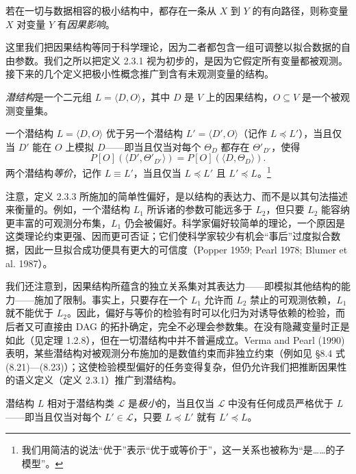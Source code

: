 \begin{definition}[推断因果性（初步）]
若在一切与数据相容的极小结构中，都存在一条从 $X$ 到 $Y$ 的有向路径，则称变量 $X$ 对变量 $Y$ 有\emph{因果影响}。
\end{definition}

这里我们把因果结构等同于科学理论，因为二者都包含一组可调整以拟合数据的自由参数。我们之所以把定义 2.3.1 视为初步的，是因为它假定所有变量都被观测。接下来的几个定义把极小性概念推广到含有未观测变量的结构。

\begin{definition}[潜结构]
\emph{潜结构}是一个二元组 $L=\langle D,O\rangle$，其中 $D$ 是 $V$ 上的因果结构，$O\subseteq V$ 是一个被观测变量集。
\end{definition}

\begin{definition}[结构偏好]
一个潜结构 $L=\langle D,O\rangle$ 优于另一个潜结构 $L'=\langle D',O\rangle$（记作 $L\preceq L'$），当且仅当 $D'$ 能在 $O$ 上模拟 $D$——即当且仅当对每个 $\Theta_D$ 都存在 $\Theta'_{D'}$，使得
\[
P[O](\langle D',\Theta'_{D'}\rangle)=P[O](\langle D,\Theta_D\rangle).
\]
两个潜结构\emph{等价}，记作 $L\equiv L'$，当且仅当 $L\preceq L'$ 且 $L'\preceq L$。\footnote{我们用简洁的说法“优于”表示“优于或等价于”，这一关系也被称为“是……的子模型”。}
\end{definition}

注意，定义 2.3.3 所施加的简单性偏好，是以结构的表达力、而不是以其句法描述来衡量的。例如，一个潜结构 $L_1$ 所诉诸的参数可能远多于 $L_2$，但只要 $L_2$ 能容纳更丰富的可观测分布集，$L_1$ 仍会被偏好。科学家偏好较简单的理论，一个原因是这类理论约束更强、因而更可否证；它们使科学家较少有机会“事后”过度拟合数据，因此一旦拟合成功便具有更大的可信度（Popper 1959; Pearl 1978; Blumer et al. 1987）。

我们还注意到，因果结构所蕴含的独立关系集对其表达力——即模拟其他结构的能力——施加了限制。事实上，只要存在一个 $L_1$ 允许而 $L_2$ 禁止的可观测依赖，$L_1$ 就不能优于 $L_2$。因此，偏好与等价的检验有时可以化归为对诱导依赖的检验，而后者又可直接由 DAG 的拓扑确定，完全不必理会参数集。在没有隐藏变量时正是如此（见定理 1.2.8），但在一切潜结构中并不普遍成立。Verma and Pearl (1990) 表明，某些潜结构对被观测分布施加的是数值约束而非独立约束（例如见 \S 8.4 式 \textup{(8.21)}—\textup{(8.23)}）；这使检验模型偏好的任务变得复杂，但仍允许我们把推断因果性的语义定义（定义 2.3.1）推广到潜结构。

\begin{definition}[极小性]
潜结构 $L$ 相对于潜结构类 $\mathcal{L}$ 是\emph{极小}的，当且仅当 $\mathcal{L}$ 中没有任何成员严格优于 $L$——即当且仅当对每个 $L'\in\mathcal{L}$，只要 $L\preceq L'$ 就有 $L'\preceq L$。
\end{definition}

